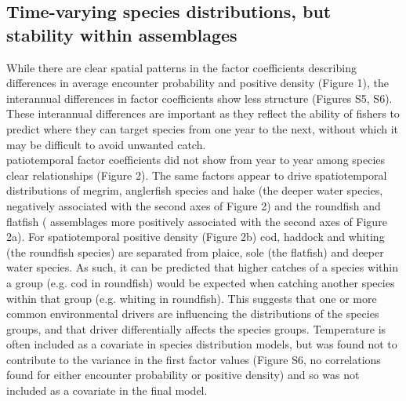 \documentclass[fleqn,10pt]{wlscirep}
\begin{document}
\begin{linenumbers}
\subsection*{Time-varying species distributions, but stability within
	 assemblages\\} 
While there are clear spatial patterns in the factor coefficients describing
differences in average  encounter probability and
positive density (Figure 1), the interannual differences in factor coefficients
show less structure (Figures S5, S6). These interannual differences are
important as they reflect the ability of fishers to predict where they can
target  species from one year to the next, without which
it may be difficult to 
avoid unwanted catch.\\

patiotemporal factor coefficients  did not show
 from year to year
  among
species  clear relationships
 (Figure
2).  The same factors appear to drive spatiotemporal  distributions of megrim, anglerfish species and hake (the
deeper water species,   negatively associated with the second axes of Figure 2)
and the roundfish and flatfish (
assemblages more positively associated with the second
axes of Figure 2a). For spatiotemporal positive density (Figure 2b) cod,
haddock and whiting (the roundfish species) are separated from plaice, sole
(the flatfish) and deeper water species. As such, it can
be predicted that higher catches of a species within a
group (e.g. cod in roundfish) would be expected when
catching another species within that group (e.g.
whiting in roundfish). This suggests that one or more common environmental
drivers are influencing the distributions of the species groups, and that
driver differentially affects the species groups.  Temperature is often
included as a covariate in species distribution models, but was found not to
contribute to the variance in the first factor values (Figure S6, no
correlations found for either  encounter
probability or positive density) and so was not included as a covariate in the
final model.\\


\end{linenumbers}
\end{document}
